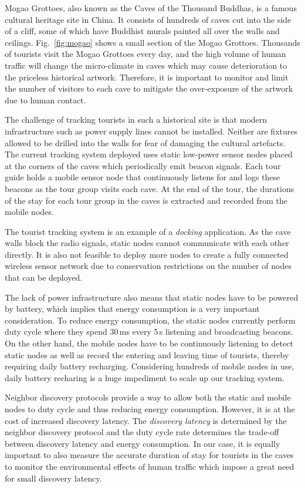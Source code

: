 \documentclass[twoside,twocolumn]{article}
\begin{document}
Mogao Grottoes, also known as the Caves of the Thousand Buddhas, is a
famous cultural heritage site in China. It consists of hundreds of
caves cut into the side of a cliff, some of which have Buddhist murals
painted all over the walls and ceilings.  Fig.~\ref{fig:mogao} shows
a small section of the Mogao Grottoes. Thousands of tourists visit the
Mogao Grottoes every day, and the high volume of human traffic will
change the micro-climate in caves which may cause deterioration to the 
priceless historical artwork. Therefore, it is important to monitor and 
limit the number of visitors to each cave to mitigate the over-exposure 
of the artwork due to human contact.

The challenge of tracking tourists in such a historical site is that
modern infrastructure such as power supply lines cannot be installed. 
Neither are fixtures allowed to be drilled into the walls
for fear of damaging the cultural artefacts. The current tracking
system deployed uses static low-power sensor nodes placed at the
corners of the caves which periodically emit beacon signals.  Each
tour guide holds a mobile sensor node that continuously listens for
and logs these beacons as the tour group visits each cave.  At the end
of the tour, the durations of the stay for each tour group in the
caves is extracted and recorded from the mobile nodes.

The tourist tracking system is an example of a {\em docking}
application. As the cave walls block the radio signals, static nodes
cannot communicate with each other directly. It is also not feasible
to deploy more nodes to create a fully connected wireless sensor
network due to conservation restrictions on the number of nodes that
can be deployed.

The lack of power infrastructure also means that static nodes have to
be powered by battery, which implies that energy consumption is a very
important consideration. To reduce energy consumption, the static
nodes currently perform duty cycle where they spend 30\,ms every 5\,s
listening and broadcasting beacons.  On the other hand, the mobile
nodes have to be continuously listening to detect static nodes as well
as record the entering and leaving time of tourists, thereby requiring
daily battery recharging. Considering hundreds of mobile nodes in use,
daily battery recharing is a huge impediment to scale up our tracking
system.

Neighbor discovery protocols provide a way to allow both the static and 
mobile nodes to duty cycle and thus reducing energy consumption. However, 
it is at the cost of increased discovery latency. The {\em discovery latency} 
is determined by the neighbor discovery protocol and the duty cycle rate 
determines the trade-off between discovery latency and energy consumption. 
In our case, it is equally important to also measure the accurate duration 
of stay for tourists in the caves to monitor the environmental effects of 
human traffic which impose a great need for small discovery latency.
\end{document}
